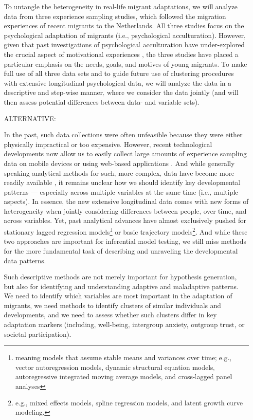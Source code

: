 \documentclass[man, 12pt, a4paper]{apa7}
\theoremstyle{break}
\theoremstyle{plain}
\begin{document}
To untangle the heterogeneity in real-life migrant adaptations, we will analyze data from three experience sampling studies, which followed the migration experiences of recent migrants to the Netherlands. All three studies focus on the psychological adaptation of migrants (i.e., psychological acculturation). However, given that past investigations of psychological acculturation have under-explored the crucial aspect of motivational experiences \citep[e.g.,][]{Kreienkamp2022d}, the three studies have placed a particular emphasis on the needs, goals, and motives of young migrants. To make full use of all three data sets and to guide future use of clustering procedures with extensive longitudinal psychological data, we will analyze the data in a descriptive and step-wise manner, where we consider the data jointly (and will then assess potential differences between data- and variable sets). 


ALTERNATIVE:

In the past, such data collections were often unfeasible because they were either physically impractical or too expensive. However, recent technological developments now allow us to easily collect large amounts of experience sampling data on mobile devices \citep[e.g.,][]{Keil2020} or using web-based applications \citep[e.g.,][]{Arslan2020}. And while generally speaking analytical methods for such, more complex, data have become more readily available \citep[e.g.,][]{ODonnell2021}, it remains unclear how we should identify key developmental patterns --- especially across multiple variables at the same time (i.e., multiple aspects). In essence, the new extensive longitudinal data comes with new forms of heterogeneity when jointly considering differences between people, over time, and across variables. Yet, past analytical advances have almost exclusively pushed for stationary lagged regression models\footnote{meaning models that assume stable means and variances over time; e.g., vector autoregression models, dynamic structural equation models, autoregressive integrated moving average models, and cross-lagged panel analyses} or basic trajectory models\footnote{e.g., mixed effects models, spline regression models, and latent growth curve modeling.}. And while these two approaches are important for inferential model testing, we still miss methods for the more fundamental task of describing and unraveling the developmental data patterns. 

Such descriptive methods are not merely important for hypothesis generation, but also for identifying and understanding adaptive and maladaptive patterns. We need to identify which variables are most important in the adaptation of migrants, we need methods to identify clusters of similar individuals and developments, and we need to assess whether such clusters differ in key adaptation markers (including, well-being, intergroup anxiety, outgroup trust, or societal participation). 
\end{document}
